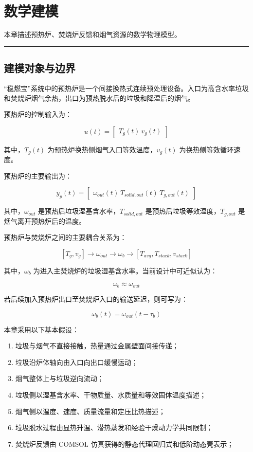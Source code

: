 \documentclass[UTF8,openany,zihao=-4,oneside]{ctexbook}
\providecommand{\tightlist}{\setlength{\itemsep}{0pt}\setlength{\parskip}{0pt}}
\newcommand{\manualdivider}{\par\vspace{0.6em}\noindent\textcolor{FGLine}{\rule{\linewidth}{0.7pt}}\vspace{0.6em}\par}
\begin{document}
\chapter{数学建模}\label{ux6570ux5b66ux5efaux6a21}

本章描述预热炉、焚烧炉反馈和烟气资源的数学物理模型。

\manualdivider

\section{建模对象与边界}\label{ux5efaux6a21ux5bf9ux8c61ux4e0eux8fb9ux754c}

``稳燃宝''系统中的预热炉是一个间接换热式连续预处理设备。入口为高含水率垃圾和焚烧炉烟气余热，出口为预热脱水后的垃圾和降温后的烟气。

预热炉的控制输入为：

\[
u(t)=\begin{bmatrix}T_g(t)\ v_g(t)
\end{bmatrix}
\]

其中，\(T_g(t)\) 为预热炉换热侧烟气入口等效温度，\(v_g(t)\) 为换热侧等效循环速度。

预热炉的主要输出为：

\[
y_p(t)=\begin{bmatrix}
\omega_{out}(t)\
T_{solid,out}(t)\
T_{g,out}(t)
\end{bmatrix}
\]

其中，\(\omega_{out}\) 是预热后垃圾湿基含水率，\(T_{solid,out}\) 是预热后垃圾等效温度，\(T_{g,out}\) 是烟气离开预热炉后的温度。

预热炉与焚烧炉之间的主要耦合关系为：

\[
[T_g,v_g]\longrightarrow \omega_{out}\longrightarrow \omega_b\longrightarrow [T_{avg},T_{stack},v_{stack}]
\]

其中，\(\omega_b\) 为进入主焚烧炉的垃圾湿基含水率。当前设计中可近似认为：

\[
\omega_b\approx\omega_{out}
\]

若后续加入预热炉出口至焚烧炉入口的输送延迟，则可写为：

\[
\omega_b(t)=\omega_{out}(t-\tau_b)
\]

本章采用以下基本假设：

\begin{enumerate}
\def\labelenumi{\arabic{enumi}.}
\tightlist
\item
  垃圾与烟气不直接接触，热量通过金属壁面间接传递；
\item
  垃圾沿炉体轴向由入口向出口缓慢运动；
\item
  烟气整体上与垃圾逆向流动；
\item
  垃圾侧以湿基含水率、干物质量、水质量和等效固体温度描述；
\item
  烟气侧以温度、速度、质量流量和定压比热描述；
\item
  垃圾脱水过程由显热升温、潜热蒸发和经验干燥动力学共同限制；
\item
  焚烧炉反馈由 COMSOL 仿真获得的静态代理回归式和低阶动态壳表示；
\end{enumerate}
\end{document}
